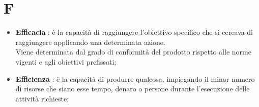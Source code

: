 % 
%
% 
%

\section{F}

\begin{itemize}
	\item \textbf{Efficacia} : è la capacità di raggiungere l'obiettivo specifico che si cercava di raggiungere applicando una determinata azione. \\
Viene determinata dal grado di conformità del prodotto rispetto alle norme vigenti e agli obiettivi prefissati;

	\item \textbf{Efficienza} : è la capacità di produrre qualcosa, impiegando il minor numero di risorse che siano esse tempo, denaro o persone durante l'esecuzione delle attività richieste; \\

\end{itemize}